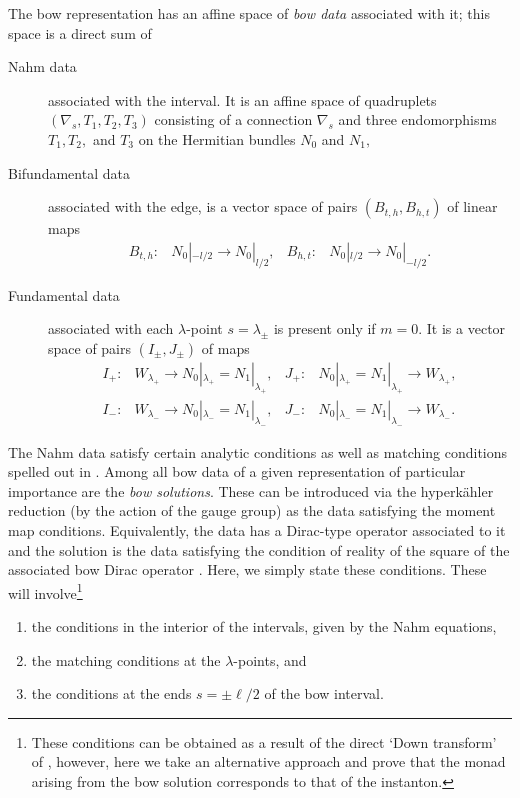 \documentclass[12pt]{article}
\theoremstyle{definition}
\theoremstyle{remark}
\numberwithin{theorem}{section}
\begin{document}
The bow representation has an affine space of {\em bow data} associated with it; this space is a direct sum of 
\begin{description}
\item[Nahm data] associated with the interval.  It is an affine space of quadruplets $(\nabla_s, T_1,T_2,T_3)$ consisting of a connection $\nabla_s$ and three endomorphisms $T_1,T_2,$ and $T_3$ on the Hermitian bundles $N_0$ and $N_1,$
\item[Bifundamental data] associated with the edge, is a vector space of pairs $(B_{t,h},B_{h,t})$ of linear maps 
\begin{align*} 
B_{t,h} : &N_0|_{-l/2}\rightarrow N_0|_{l/2},& 
B_{h,t}:&N_0|_{l/2} \rightarrow N_0|_{-l/2}.
\end{align*}
\item[Fundamental data] associated with each $\lambda$-point $s=\lambda_\pm$ is present only if $m=0.$ It is a vector space of pairs 
$(I_\pm,J_\pm)$ of maps 
\begin{align*}
I_+: &W_{\lambda_+}\rightarrow N_0|_{\lambda_+}=N_1|_{\lambda_+},&
J_+: &N_0|_{\lambda_+}=N_1|_{\lambda_+}\rightarrow W_{\lambda_+},\\
I_-: &W_{\lambda_-}\rightarrow N_0|_{\lambda_-}=N_1|_{\lambda_-},&
J_-: &N_0|_{\lambda_-}=N_1|_{\lambda_-}\rightarrow W_{\lambda_-}.
\end{align*}
\end{description}
The Nahm data satisfy certain analytic conditions as well as matching conditions spelled out in \cite{Second}.   Among all bow data of a given representation of particular importance are the {\em bow solutions}.
  These can be introduced via the hyperk\"ahler reduction (by the action of the gauge group) as the data satisfying the moment map conditions. Equivalently, the data has a Dirac-type operator associated to it and the solution is the data satisfying the  condition of reality of the square of the associated bow Dirac operator \cite{Cherkis:2008ip,Cherkis:2010bn}.  Here, we simply state  these conditions.  These will involve\footnote{
  These conditions can be obtained as a result of the direct `Down transform' of 
\cite{Third}, however, here we take an alternative approach and prove that the monad arising from the bow solution corresponds to that of the instanton.}
\begin{enumerate}
\item
the conditions in the interior of the intervals, given by the Nahm equations,
\item  
the matching conditions at the $\lambda$-points, and
\item 
the conditions at the ends $s=\pm\ell/2$ of the bow interval.  
\end{enumerate}
\end{document}
